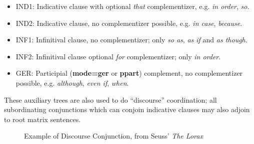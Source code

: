 \begin{itemize}
\item IND1: Indicative clause with optional {\it that} complementizer,
e.g. {\it in order}, {\it so}.
\item IND2: Indicative clause, no complementizer possible, e.g. {\it
in case}, {\it because}.
\item INF1: Infinitival clause, no complementizer; only {\it so as}, {\it
as if} and {\it as though}.
\item INF2: Infinitival clause optional {\it for} complementizer; only {\it
in order}.
\item GER: Participial ({\bf mode=ger} or {\bf ppart}) complement, no
complementizer possible, e.g. {\it although}, {\it even if}, {\it
when}. 
\end{itemize}

These auxiliary trees are also used to do ``discourse'' coordination; all
subordinating conjunctions which can conjoin indicative clauses may also
adjoin to root matrix sentences.  

\begin{figure}[ht]
\centering
\hspace{0in}
\caption{Example of Discourse Conjunction, from Seuss' {\it The Lorax}}
\end{figure}






